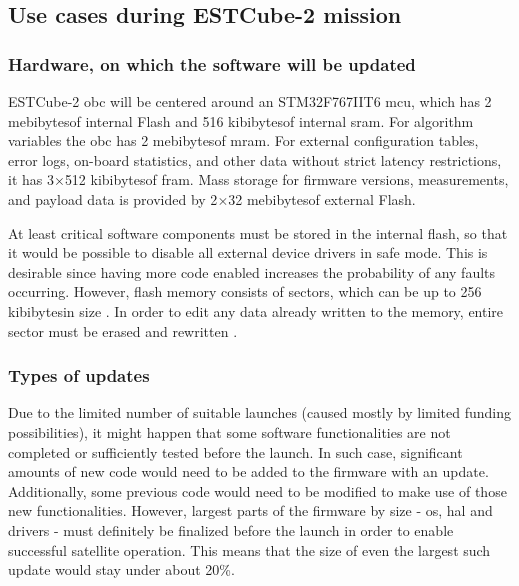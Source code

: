 \subsection{Use cases during ESTCube-2 mission}

\subsubsection{Hardware, on which the software will be updated}\label{s:hardware}

ESTCube-2 \gls{obc} will be centered around an STM32F767IIT6 \gls{mcu}, which has 2 mebibytes\footnotemark of internal Flash and 516 kibibytes\footnotemark[\value{footnote}] of internal \gls{sram}. For algorithm variables the \gls{obc} has 2 mebibytes\footnotemark[\value{footnote}] of \gls{mram}. For external configuration tables, error logs, on-board statistics, and other data without strict latency restrictions, it has 3$\times$512 kibibytes\footnotemark[\value{footnote}] of \gls{fram}. Mass storage for firmware versions, measurements, and payload data is provided by 2$\times$32 mebibytes\footnotemark[\value{footnote}] of external Flash.
\cite{Haljaste2017}

At least critical software components must be stored in the internal flash, so that it would be possible to disable all external device drivers in safe mode. This is desirable since having more code enabled increases the probability of any faults occurring. However, flash memory consists of sectors, which can be up to 256 kibibytes\footnotemark[\value{footnote}] in size \cite{STMicroelectronics2018}. In order to edit any data already written to the memory, entire sector must be erased and rewritten \cite{STMicroelectronics2018}.


\subsubsection{Types of updates}

Due to the limited number of suitable launches (caused mostly by limited funding possibilities), it might happen that some software functionalities are not completed or sufficiently tested before the launch. In such case, significant amounts of new code would need to be added to the firmware with an update. Additionally, some previous code would need to be modified to make use of those new functionalities. However, largest parts of the firmware by size - \gls{os}, \gls{hal} and drivers - must definitely be finalized before the launch in order to enable successful satellite operation. This means that the size of even the largest such update would stay under about 20\%.

